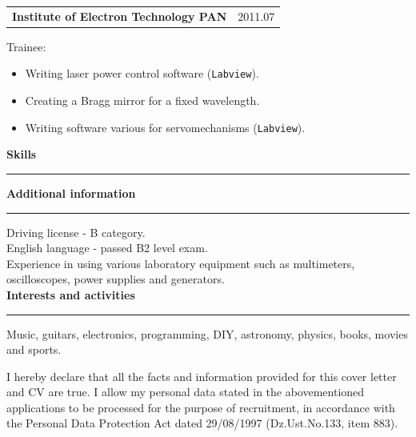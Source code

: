 \documentclass{article}
\newcommand{\header}[1] 
{
	\textbf{\large #1}
	\vspace{0.005\textheight}
	\hrule 
	\vspace{0.005\textheight}
}
\begin{document}
\begin{tabular}{@{} m{} R{0.37\textwidth} }
\textbf{Institute of Electron Technology PAN} & {2011.07} 
\end{tabular}
Trainee:
\begin{itemize}
	\item Writing laser power control software (\texttt{Labview}).
	\item Creating a Bragg mirror for a fixed wavelength.
	\item Writing software various for servomechanisms (\texttt{Labview}).
\end{itemize}

\textbf{\large Skills}
\vspace{0.005\textheight}
\hrule 


\header{Additional information}
Driving license - B category.\\
English language - passed B2 level exam.\\
Experience in using various laboratory equipment such as multimeters, oscilloscopes, power supplies and generators.\\
\header{Interests and activities}
Music, guitars, electronics, programming, DIY, astronomy, physics, books, movies and sports.
\vspace{0.05\textheight}
\noindent\newline
\scriptsize
\begin{minipage}{\textwidth}
	I hereby declare that all the facts and information provided for this cover letter and CV are true. I allow my personal data stated in the abovementioned applications to be processed for the purpose of recruitment, in accordance with the Personal Data Protection Act dated 29/08/1997 (Dz.Ust.No.133, item 883).
\end{minipage}
\end{document}
